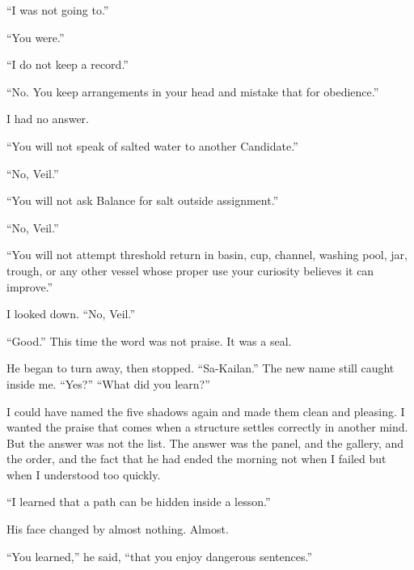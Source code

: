 ``I was not going to.''\par

``You were.''\par

``I do not keep a record.''\par

``No. You keep arrangements in your head and mistake that for obedience.''\par

I had no answer.\par

``You will not speak of salted water to another Candidate.''\par

``No, Veil.''\par

``You will not ask Balance for salt outside assignment.''\par

``No, Veil.''\par

``You will not attempt threshold return in basin, cup, channel, washing pool, jar, trough, or any other vessel whose proper use your curiosity believes it can improve.''\par

I looked down. ``No, Veil.''\par

``Good.'' This time the word was not praise. It was a seal.\par

He began to turn away, then stopped. ``Sa-Kailan.'' The new name still caught inside me. ``Yes?'' ``What did you learn?''\par

I could have named the five shadows again and made them clean and pleasing. I wanted the praise that comes when a structure settles correctly in another mind. But the answer was not the list. The answer was the panel, and the gallery, and the order, and the fact that he had ended the morning not when I failed but when I understood too quickly.\par

``I learned that a path can be hidden inside a lesson.''\par

His face changed by almost nothing. Almost.\par

``You learned,'' he said, ``that you enjoy dangerous sentences.''\par


